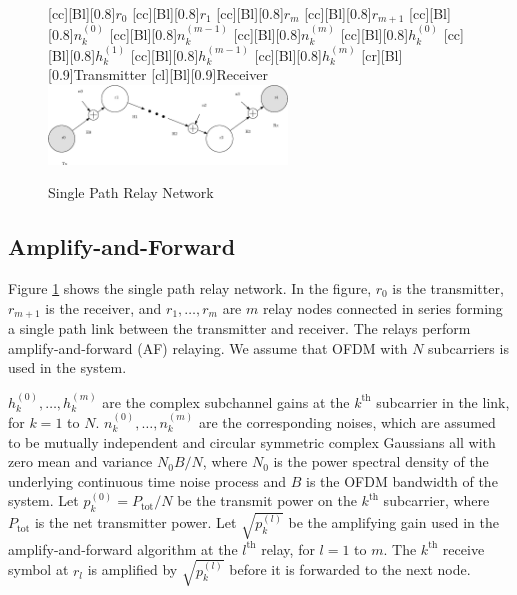 \documentclass[conference]{IEEEtran}
\begin{document}
\begin{figure}
  \centering
    [cc][Bl][0.8]{$r_0$}
    [cc][Bl][0.8]{$r_1$}
    [cc][Bl][0.8]{$r_m$}
    [cc][Bl][0.8]{$r_{m+1}$}
    [cc][Bl][0.8]{$n_k^{(0)}$}
    [cc][Bl][0.8]{$n_k^{(m-1)}$}
    [cc][Bl][0.8]{$n_k^{(m)}$}
    [cc][Bl][0.8]{$h_k^{(0)}$}
    [cc][Bl][0.8]{$h_k^{(1)}$}
    [cc][Bl][0.8]{$h_k^{(m-1)}$}
    [cc][Bl][0.8]{$h_k^{(m)}$}
    [cr][Bl][0.9]{Transmitter}
    [cl][Bl][0.9]{Receiver}
    \includegraphics[width=2.5in]{sp_model.eps}
   \caption{Single Path Relay Network \label{fig:sp_sm} }
\end{figure}

\subsection{Amplify-and-Forward}
\label{sec:sp_af}
Figure \ref{fig:sp_sm} shows the single path
relay network. In the figure, $r_0$ is the transmitter, $r_{m+1}$
is the receiver, and $r_1, \ldots, r_m$ are $m$ relay nodes
connected in series forming a single path link between the
transmitter and receiver.  The relays perform amplify-and-forward
(AF) relaying. We assume that OFDM with $N$ subcarriers is used in
the system.

$h_k^{(0)}, \ldots, h_k^{(m)}$ are the complex subchannel gains at the $k^{\mbox{th}}$ subcarrier in the link, for $k = 1$ to $N$.   $n_k^{(0)}, \ldots, n_k^{(m)}$ are the corresponding noises, which are assumed to be mutually independent and circular symmetric complex Gaussians all with zero mean and variance $N_0 B / N$, where $N_0$ is the power spectral density of the underlying continuous time noise process and $B$ is the OFDM bandwidth of the system.  Let $p_k^{(0)} = P_{\mbox{tot}} / N$ be the transmit power on the $k^{\mbox{th}}$ subcarrier, where $P_{\mbox{tot}}$ is the net transmitter power.  Let  $\sqrt{p_k^{(l)}}$ be the amplifying gain used in the amplify-and-forward algorithm at the $l^{\mbox{th}}$ relay, for $l=1$ to $m$.  The $k^{\mbox{th}}$ receive symbol at $r_l$ is amplified by $\sqrt{p_k^{(l)}}$ before it is forwarded to the next node.
\end{document}
